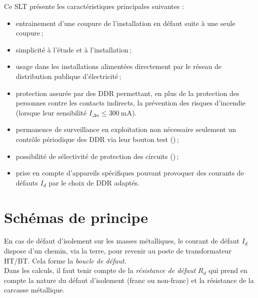 Ce SLT présente les caractéristiques principales suivantes :
\begin{itemize}
\item entrainement d'une coupure de l'installation en défaut suite à une seule coupure\,;
\item simplicité à l'étude et à l'installation\,;
\item usage dans les installations alimentées directement par le réseau de distribution publique d'électricité\,;
\item protection assurée par des DDR permettant, en plus de la protection des personnes contre les contacts indirects, la prévention des risques d'incendie (lorsque leur sensibilité $I_{\Delta n}\leq\SI{300}{\milli\ampere}$).
\item permanence de surveillance en exploitation non nécessaire seulement un contrôle périodique des DDR via leur bouton test ()\,;
\item possibilité de sélectivité de protection des circuits ()\,;
\item prise en compte d'appareils spécifiques pouvant provoquer des courants de défauts $I_d$ par le choix de DDR adaptés.
\end{itemize}

\section{Schémas de principe}

\begin{figure}[h]
\caption{Installation Terre-Terre}
\begin{subfigure}[t]{0.49\linewidth}

\end{subfigure}
\begin{subfigure}[t]{0.49\linewidth}

\end{subfigure}
\end{figure}

En cas de défaut d'isolement sur les masses métalliques, le courant de défaut $I_d$ dispose d'un chemin, via la terre, pour revenir au poste de transformateur HT/BT. Cela forme la \emph{boucle de défaut}.\\
Dans les calculs, il faut tenir compte de la \emph{résistance de défaut} $R_d$ qui prend en compte la nature du défaut d'isolement (franc ou non-franc) et la résistance de la carcasse métallique.\\

